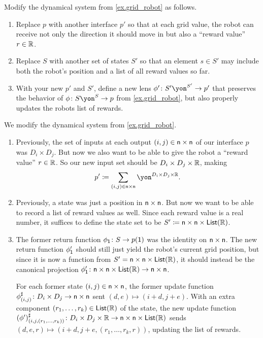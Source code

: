 \documentclass[Book-Poly]{subfiles}
\begin{document}
\begin{exercise} \label{exc.grid_reward}
Modify the dynamical system from \cref{ex.grid_robot} as follows.
\begin{enumerate}
	\item Replace $p$ with another interface $p'$ so that at each grid value, the robot can receive not only the direction it should move in but also a ``reward value'' $r\in\mathbb{R}$. 
	\item Replace $S$ with another set of states $S'$ so that an element $s\in S'$ may include both the robot's position and a list of all reward values so far.
	\item With your new $p'$ and $S'$, define a new lens $\phi'\colon S'\yon^{S'}\to p'$ that preserves the behavior of $\phi\colon S\yon^S\to p$ from \cref{ex.grid_robot}, but also properly updates the robots list of rewards.
\qedhere
\end{enumerate}
\begin{solution}
We modify the dynamical system from \cref{ex.grid_robot}.
\begin{enumerate}
    \item Previously, the set of inputs at each output $(i,j)\in\mathsf{n}\times\mathsf{n}$ of our interface $p$ was $D_i\times D_j$.
    But now we also want to be able to give the robot a ``reward value'' $r\in\mathbb{R}$.
    So our new input set should be $D_i\times D_j\times\mathbb{R}$, making
    \[
        p'\coloneqq\sum_{(i,j)\in\ord{n}\times\ord{n}} \yon^{D_i\times D_j\times\rr}.
    \]
    \item Previously, a state was just a position in $\mathsf{n}\times\mathsf{n}$.
    But now we want to be able to record a list of reward values as well.
    Since each reward value is a real number, it suffices to define the state set to be $S'\coloneqq\mathsf{n}\times\mathsf{n}\times\mathsf{List}(\mathbb{R})$.
    \item The former return function $\phi_{\textsf{1}}\colon S\to p(\textsf{1})$ was the identity on $\mathsf{n}\times\mathsf{n}$.
    The new return function $\phi'_{\textsf{1}}$ should still just yield the robot's current grid position, but since it is now a function from $S'=\mathsf{n}\times\mathsf{n}\times\mathsf{List}(\mathbb{R})$, it should instead be the canonical projection $\phi'_{\textsf{1}}\colon \mathsf{n}\times\mathsf{n}\times\mathsf{List}(\mathbb{R})\to\mathsf{n}\times\mathsf{n}$.
    
    For each former state $(i,j)\in\mathsf{n}\times\mathsf{n}$, the former update function $\phi^\sharp_{(i,j)}\colon D_i\times D_j\to\mathsf{n}\times\mathsf{n}$ sent $(d,e)\mapsto(i+d,j+e)$.
    With an extra component $(r_1,\ldots,r_k)\in\mathsf{List}(\mathbb{R})$ of the state, the new update function $(\phi')^\sharp_{(i,j,(r_1,\ldots,r_k))}\colon D_i\times D_j\times\mathbb{R}\to\mathsf{n}\times\mathsf{n}\times\mathsf{List}(\mathbb{R})$ sends $(d,e,r)\mapsto(i+d,j+e,(r_1,\ldots,r_k,r))$, updating the list of rewards.
\end{enumerate}
\end{solution}
\end{exercise}
\end{document}

